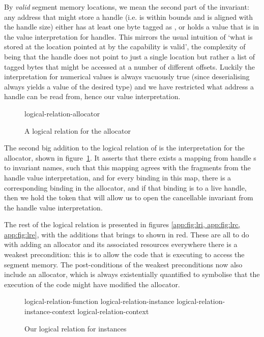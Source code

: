 \documentclass[acmsmall,screen]{acmart}\settopmatter{}
\begin{document}
By \emph{valid} segment memory locations, we mean the second part of the invariant: any address that might store a handle (i.e. is within bounds and is aligned with the handle size) either has at least one byte tagged as \xxWNumeric, or holds a value that is in the value interpretation for handles. This mirrors the usual intuition of `what is stored at the location pointed at by the capability is valid', the complexity of \mswasm being that the handle does not point to just a single location but rather a list of tagged bytes that might be accessed at a number of different offsets. Luckily the interpretation for numerical values is always vacuously true (since deserialising always yields a value of the desired type) and we have restricted what address a handle can be read from, hence our value interpretation.

\begin{figure}[t]
  {logical-relation-allocator}
  \label{app:fig:lra}
  \caption{A logical relation for the allocator}
\end{figure}

The second big addition to the logical relation of \iriswasm is the interpretation for the allocator, shown in figure~\ref{app:fig:lra}. It asserts that there exists a mapping from handle \xxWid{}s to invariant names, such that this mapping agrees with the fragments from the handle value interpretation, and for every binding in this map, there is a corresponding binding in the allocator, and if that binding is to a live handle, then we hold the token that will allow us to open the cancellable invariant from the handle value interpretation.

The rest of the logical relation is presented in figures \ref{app:fig:lri, app:fig:lrc, app:fig:lre}, with the additions that \irismswasm brings to \iriswasm shown in red. These are all to do with adding an allocator and its associated resources everywhere there is a weakest precondition: this is to allow the code that is executing to access the segment memory. The post-conditions of the weakest preconditions now also include an allocator, which is always existentially quantified to symbolise that the execution of the code might have modified the allocator.

\begin{figure}[t]
  {logical-relation-function}
  {logical-relation-instance}
  {logical-relation-instance-context}
  {logical-relation-context}
\label{app:fig:lri}
\caption{Our logical relation for instances}
\end{figure}
\end{document}
